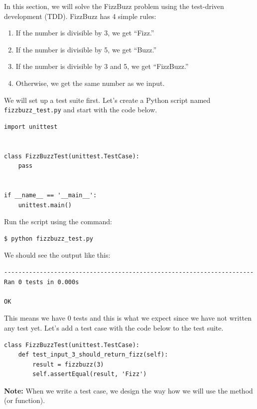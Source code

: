 \documentclass{article}
\begin{document}
\noindent In this section, we will solve the FizzBuzz problem using the
test-driven development (TDD). FizzBuzz has 4 simple rules:

\begin{enumerate}
  \item If the number is divisible by 3, we get ``Fizz.''
  \item If the number is divisible by 5, we get ``Buzz.''
  \item If the number is divisible by 3 and 5, we get ``FizzBuzz.''
  \item Otherwise, we get the same number as we input.
\end{enumerate}

\noindent We will set up a test suite first. Let's create a Python script named
{\tt fizzbuzz\_test.py} and start with the code below.

\begin{verbatim}
import unittest


class FizzBuzzTest(unittest.TestCase):
    pass


if __name__ == '__main__':
    unittest.main()
\end{verbatim}

\noindent Run the script using the command:

\begin{verbatim}
$ python fizzbuzz_test.py
\end{verbatim}

\noindent We should see the output like this:

\begin{verbatim}
----------------------------------------------------------------------
Ran 0 tests in 0.000s

OK
\end{verbatim}

\noindent This means we have 0 tests and this is what we expect since we have
not written any test yet. Let's add a test case with the code below to the test
suite.

\begin{verbatim}
class FizzBuzzTest(unittest.TestCase):
    def test_input_3_should_return_fizz(self):
        result = fizzbuzz(3)
        self.assertEqual(result, 'Fizz')
\end{verbatim}

\noindent \textbf{Note:} When we write a test case, we design the way how we
will use the method (or function). \\
\end{document}
